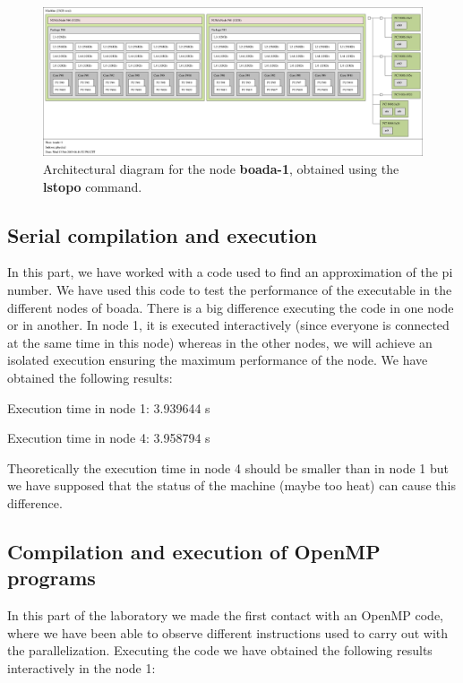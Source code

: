 \documentclass[12pt, a4paper]{article}
\begin{document}
\begin{figure}[H]
  \centering
  \includegraphics[scale=0.25]{./images/boada1-4}
  \caption{Architectural diagram for the node \textbf{boada-1}, obtained using the \textbf{lstopo} command.}
  \label{etiqueta}
\end{figure}

\subsection{Serial compilation and execution}

In this part, we have worked with a code used to find an approximation of the pi number.
We have used this code to test the performance of the executable in the different nodes of boada. There is a big difference executing the code in one node or in another. In node 1, it is executed interactively (since everyone is connected at the same time in this node) whereas in the other nodes, we will achieve an isolated execution ensuring the maximum performance of the node.
We have obtained the following results:\newline

Execution time in node 1: 3.939644 s

Execution time in node 4: 3.958794 s\newline

Theoretically the execution time in node 4 should be smaller than in node 1 but we have supposed that the status of the machine (maybe too heat) can cause this difference.

\subsection{Compilation and execution of OpenMP programs}

In this part of the laboratory we made the first contact with an OpenMP code, where we have been able to observe different instructions used to carry out with the parallelization.
Executing the code we have obtained the following results interactively in the node 1:\newline
\end{document}
